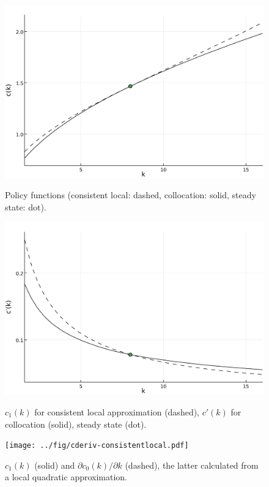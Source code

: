 \documentclass[a4paper,11pt]{article}
\newcommand{\figwidth}{\linewidth}
\begin{document}
\begin{figure}[b]
  \centering
  \begin{minipage}[t]{0.48\linewidth}
    \includegraphics[width=\figwidth]{../fig/ck.pdf}
    \caption{Policy functions (consistent local: dashed, collocation: solid, steady state: dot).}
    \label{fig:ck}
  \end{minipage}\hfill%
  \begin{minipage}[t]{0.48\linewidth}
    \includegraphics[width=\figwidth]{../fig/ckprime.pdf}
    \caption{$c_1(k)$ for consistent local approximation (dashed), $c'(k)$ for collocation (solid), steady state (dot).}
    \label{fig:ckprime}
  \end{minipage}
  \begin{minipage}[t]{0.48\linewidth}
    \texttt{[image: ../fig/cderiv-consistentlocal.pdf]}
    \caption{$c_1(k)$ (solid) and $\partial c_0(k)/ \partial k$ (dashed), the latter calculated from a local quadratic approximation.}

\end{minipage}
\end{figure}
\end{document}
